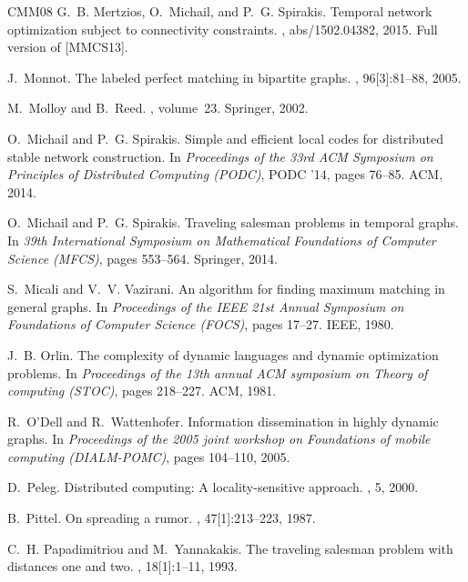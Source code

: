 \documentclass[oribibl, 11pt]{llncs}
\begin{document}
\begin{thebibliography}{CMM{\etalchar{+}}08}
G.~B. Mertzios, O.~Michail, and P.~G. Spirakis.
\newblock Temporal network optimization subject to connectivity constraints.
, abs/1502.04382, 2015.
\newblock Full version of [MMCS13].

J.~Monnot.
\newblock The labeled perfect matching in bipartite graphs.
, 96[3]:81--88, 2005.

M.~Molloy and B.~Reed.
, volume~23.
\newblock Springer, 2002.

O.~Michail and P.~G. Spirakis.
\newblock Simple and efficient local codes for distributed stable network
  construction.
\newblock In {\em Proceedings of the 33rd ACM Symposium on Principles of
  Distributed Computing (PODC)}, PODC '14, pages 76--85. ACM, 2014.

O.~Michail and P.~G. Spirakis.
\newblock Traveling salesman problems in temporal graphs.
\newblock In {\em 39th International Symposium on Mathematical Foundations of
  Computer Science (MFCS)}, pages 553--564. Springer, 2014.

S.~Micali and V.~V. Vazirani.
\newblock An  algorithm for finding maximum
  matching in general graphs.
\newblock In {\em Proceedings of the IEEE 21st Annual Symposium on Foundations
  of Computer Science (FOCS)}, pages 17--27. IEEE, 1980.

J.~B. Orlin.
\newblock The complexity of dynamic languages and dynamic optimization
  problems.
\newblock In {\em Proceedings of the 13th annual ACM symposium on Theory of
  computing (STOC)}, pages 218--227. ACM, 1981.

R.~O'Dell and R.~Wattenhofer.
\newblock Information dissemination in highly dynamic graphs.
\newblock In {\em Proceedings of the 2005 joint workshop on Foundations of
  mobile computing (DIALM-POMC)}, pages 104--110, 2005.

D.~Peleg.
\newblock Distributed computing: A locality-sensitive approach.
, 5,
  2000.

B.~Pittel.
\newblock On spreading a rumor.
, 47[1]:213--223, 1987.

C.~H. Papadimitriou and M.~Yannakakis.
\newblock The traveling salesman problem with distances one and two.
, 18[1]:1--11, 1993.


\end{thebibliography}
\end{document}
